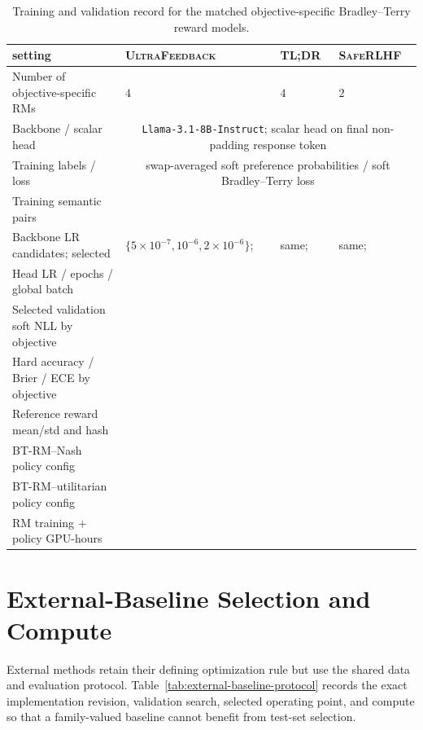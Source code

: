 \documentclass{article}
\theoremstyle{remark}
\theoremstyle{plain}
\newcommand{\pending}{\textemdash}
\begin{document}
\begin{table}[t]
\centering\scriptsize
\setlength{\tabcolsep}{2.2pt}
\caption{Training and validation record for the matched objective-specific Bradley--Terry reward models.}
\label{tab:rm-baseline-protocol}
\begin{tabular}{@{}p{}p{}p{}p{}@{}}
\toprule
setting & \textsc{UltraFeedback} & \textsc{TL;DR} & \textsc{SafeRLHF}\\
\midrule
Number of objective-specific RMs & $4$ & $4$ & $2$\\
Backbone / scalar head & \multicolumn{3}{c}{\texttt{Llama-3.1-8B-Instruct}; scalar head on final non-padding response token}\\
Training labels / loss & \multicolumn{3}{c}{swap-averaged soft preference probabilities / soft Bradley--Terry loss}\\
Training semantic pairs & \pending & \pending & \pending\\
Backbone LR candidates; selected & $\{5\!\times\!10^{-7},10^{-6},2\!\times\!10^{-6}\}$; \pending & same; \pending & same; \pending\\
Head LR / epochs / global batch & \pending & \pending & \pending\\
Selected validation soft NLL by objective & \pending & \pending & \pending\\
Hard accuracy / Brier / ECE by objective & \pending & \pending & \pending\\
Reference reward mean/std and hash & \pending & \pending & \pending\\
BT-RM--Nash policy config & \pending & \pending & \pending\\
BT-RM--utilitarian policy config & \pending & \pending & \pending\\
RM training + policy GPU-hours & \pending & \pending & \pending\\
\bottomrule
\end{tabular}
\end{table}

\section{External-Baseline Selection and Compute}
\label{app:external-baselines}
External methods retain their defining optimization rule but use the shared data and evaluation protocol. Table~\ref{tab:external-baseline-protocol} records the exact implementation revision, validation search, selected operating point, and compute so that a family-valued baseline cannot benefit from test-set selection.
\end{document}
